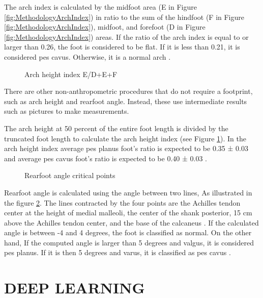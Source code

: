 The arch index is calculated by the midfoot area (E in Figure \ref{fig:MethodologyArchIndex}) in ratio to the sum of the hindfoot (F in Figure \ref{fig:MethodologyArchIndex}), midfoot, and forefoot (D in Figure \ref{fig:MethodologyArchIndex}) areas. If the ratio of the arch index is equal to or larger than 0.26, the foot is considered to be flat. If it is less than 0.21, it is considered pes cavus. Otherwise, it is a normal arch \cite{igbigbi2005arch}. 

\begin{figure}[htbp]
\centering
{}
\caption{Arch height index E/D+E+F \cite{miller2014effect}}
\label{fig:MethodologyArchHeightIndex}
\end{figure}

There are other non-anthropometric procedures that do not require a footprint, such as arch height and rearfoot angle. Instead, these use intermediate results such as pictures to make measurements.

The arch height at 50 percent of the entire foot length is divided by the truncated foot length to calculate the arch height index (see Figure \ref{fig:MethodologyArchHeightIndex}). In the arch height index average pes planus foot’s ratio is expected to be 0.35 ± 0.03 and average pes cavus foot’s ratio is expected to be 0.40 ± 0.03 \cite{hillstrom2013foot}.

\begin{figure}[htbp]
\centering
{}
\caption{Rearfoot angle critical points \cite{langley2016clinical}}
\label{fig:MethodologyRearfootAngle}
\end{figure}

Rearfoot angle is calculated using the angle between two lines, As illustrated in the figure \ref{fig:MethodologyRearfootAngle}. The lines contracted by the four points are the Achilles tendon center at the height of medial malleoli, the center of the shank posterior, 15 cm above the Achilles tendon center, and the base of the calcaneus \cite{huerta2008relationship}. If the calculated angle is between -4 and 4 degrees, the foot is classified as normal. On the other hand, If the computed angle is larger than 5 degrees and valgus, it is considered pes planus. If it is then 5 degrees and varus, it is classified as pes cavus \cite{jonson1997intraexaminer}.

\section{DEEP LEARNING}

